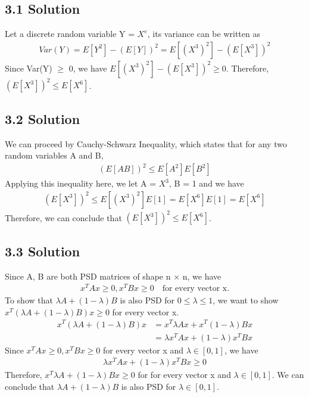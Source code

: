 \documentclass{article}
\begin{document}
\subsection*{3.1 Solution}
Let a discrete random variable Y = $X^e$, its variance can be written as
\begin{align*}
    Var(Y) = E[Y^2] - (E[Y])^2 = E[(X^3)^2] - (E[X^3])^2
\end{align*}
Since Var(Y) $\geq$ 0, we have $E[(X^3)^2] - (E[X^3])^2 \geq 0$. Therefore, $(E[X^3])^2 \leq E[X^6]$.

\subsection*{3.2 Solution}
We can proceed by Cauchy-Schwarz Inequality, which states that for any two random variables A and B, 
\begin{align*}
    (E[AB])^2 \leq E[A^2]E[B^2]
\end{align*}
Applying this inequality here, we let A = $X^3$, B = 1 and we have
\begin{align*}
    (E[X^3])^2 \leq E[(X^3)^2]E[1] = E[X^6]E[1] = E[X^6]
\end{align*}
Therefore, we can conclude that $(E[X^3])^2 \leq E[X^6]$.

\subsection*{3.3 Solution}
Since A, B are both PSD matrices of shape n $\times$ n, we have
\begin{align*}
    x^T A x \geq 0, x^T B x \geq 0 \quad \text{for every vector x.}
\end{align*}
To show that $\lambda A + (1 - \lambda)B$ is also PSD for $0 \leq \lambda \leq 1$, we want to show $x^T (\lambda A + (1 - \lambda)B) x \geq 0$ for every vector x.
\begin{align*}
    x^T (\lambda A + (1 - \lambda)B) x &= x^T \lambda A x + x^T (1 - \lambda) B x \\
    &= \lambda x^T A x + (1 - \lambda) x^T B x
\end{align*}
Since $x^T A x \geq 0, x^T B x \geq 0$ for every vector x and $\lambda \in [0,1]$, we have 
\begin{align*}
    \lambda x^T A x + (1 - \lambda) x^T B x \geq 0
\end{align*}
Therefore,  $x^T \lambda A + (1 - \lambda)B x \geq 0 $ for for every vector x and $\lambda \in [0,1]$. We can conclude that $\lambda A + (1 - \lambda)B $ is also PSD for $\lambda \in [0,1]$.
\end{document}

